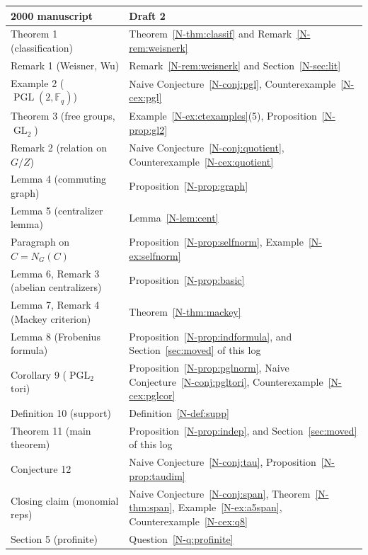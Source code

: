\documentclass[12pt,letterpaper]{article}
\newcommand{\F}{\mathbb{F}}
\DeclareMathOperator{\PGL}{PGL}
\DeclareMathOperator{\GL}{GL}
\begin{document}
\begin{center}
\renewcommand{\arraystretch}{1.12}
\begin{tabular}{>{\raggedright}p{5.2cm}>{\raggedright\arraybackslash}p{9cm}}
\toprule
2000 manuscript & Draft 2\\
\midrule
Theorem 1 (classification) & Theorem~\ref{N-thm:classif} and
Remark~\ref{N-rem:weisnerk}\\
Remark 1 (Weisner, Wu) & Remark~\ref{N-rem:weisnerk} and
Section~\ref{N-sec:lit}\\
Example 2 ($\PGL(2,\F_q)$) & Naive Conjecture~\ref{N-conj:pgl},
Counterexample~\ref{N-cex:pgl}\\
Theorem 3 (free groups, $\GL_2$) & Example~\ref{N-ex:ctexamples}(5),
Proposition~\ref{N-prop:gl2}\\
Remark 2 (relation on $G/Z$) & Naive Conjecture~\ref{N-conj:quotient},
Counterexample~\ref{N-cex:quotient}\\
Lemma 4 (commuting graph) & Proposition~\ref{N-prop:graph}\\
Lemma 5 (centralizer lemma) & Lemma~\ref{N-lem:cent}\\
Paragraph on $C=N_G(C)$ & Proposition~\ref{N-prop:selfnorm},
Example~\ref{N-ex:selfnorm}\\
Lemma 6, Remark 3 (abelian centralizers) & Proposition~\ref{N-prop:basic}\\
Lemma 7, Remark 4 (Mackey criterion) & Theorem~\ref{N-thm:mackey}\\
Lemma 8 (Frobenius formula) & Proposition~\ref{N-prop:indformula}, and
Section~\ref{sec:moved} of this log\\
Corollary 9 ($\PGL_2$ tori) & Proposition~\ref{N-prop:pglnorm}, Naive
Conjecture~\ref{N-conj:pgltori}, Counterexample~\ref{N-cex:pglcor}\\
Definition 10 (support) & Definition~\ref{N-def:supp}\\
Theorem 11 (main theorem) & Proposition~\ref{N-prop:indep}, and
Section~\ref{sec:moved} of this log\\
Conjecture 12 & Naive Conjecture~\ref{N-conj:tau},
Proposition~\ref{N-prop:taudim}\\
Closing claim (monomial reps) & Naive Conjecture~\ref{N-conj:span},
Theorem~\ref{N-thm:span}, Example~\ref{N-ex:a5span},
Counterexample~\ref{N-cex:q8}\\
Section 5 (profinite) & Question~\ref{N-q:profinite}\\
\bottomrule
\end{tabular}
\end{center}
\end{document}
